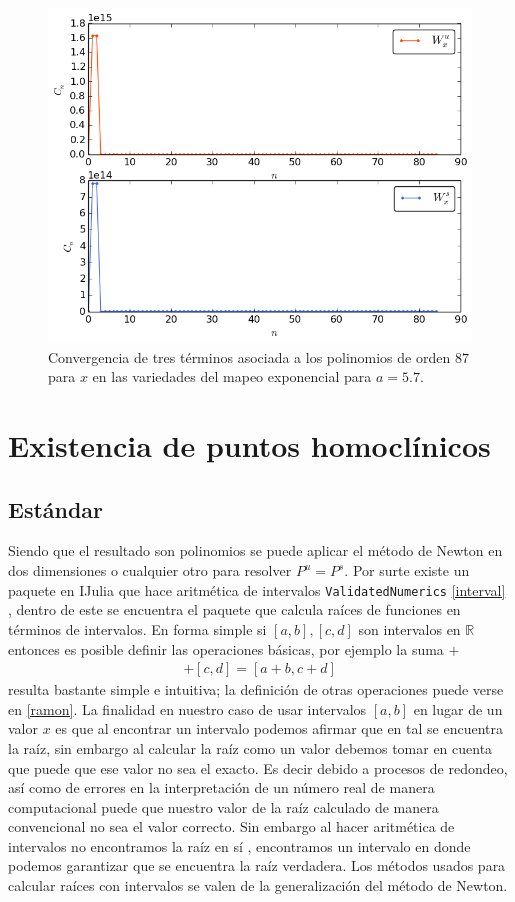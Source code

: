 \begin{figure}[H]
\centering
\includegraphics[scale=0.5]{convergenciaJungT}
\caption{Convergencia de tres términos asociada a los polinomios de orden $87$ para $x$ en las variedades del mapeo exponencial para $a=5.7$.}
\label{convergenciaJ3}
\end{figure}



\section{Existencia de puntos homoclínicos}
\subsection{Estándar}
Siendo que el resultado son polinomios se puede aplicar el método de Newton en dos dimensiones o cualquier otro para resolver $P^{u}=P^{s}$. Por surte existe un paquete en IJulia que hace aritmética de intervalos \texttt{ValidatedNumerics} \ref{interval} , dentro de este se encuentra el paquete que calcula raíces de funciones en términos de intervalos. En forma simple si $[a,b],[c,d]$ son intervalos en $\mathbb{R}$ entonces es posible definir las operaciones básicas, por ejemplo la suma $+$
\begin{eqnarray}
[a,b]+[c,d]=[a+b,c+d]
\end{eqnarray}
resulta bastante simple e intuitiva; la definición de otras operaciones puede verse en \ref{ramon}. La finalidad en nuestro caso de usar intervalos $[a,b]$ en lugar de un valor $x$ es que al encontrar un intervalo podemos afirmar que en tal se encuentra la raíz, sin embargo al calcular la raíz como un valor debemos tomar en cuenta que puede que ese valor no sea el exacto. Es decir debido a procesos de redondeo, así como de errores en la interpretación de un número real de manera computacional puede que nuestro valor de la raíz calculado de manera convencional no sea el valor correcto. Sin embargo al hacer aritmética de intervalos no encontramos la raíz en sí , encontramos un intervalo en donde podemos garantizar que se encuentra la raíz verdadera. Los métodos usados para calcular raíces con intervalos se valen de la generalización del método de Newton.

